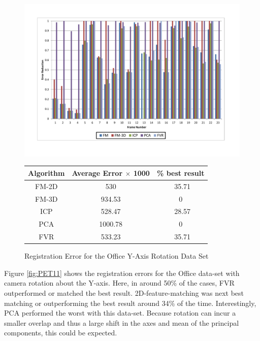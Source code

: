 \begin{figure}
\centering
\includegraphics[width=6in]{images/results/Office_Texture_Rotation}
\caption{Registration Error for the Office Y-Axis Rotation Data Set}
\label{fig:PET11}

\begin{tabular}{ccc}
\hline
\textbf{Algorithm} & \textbf{Average Error $\times$ 1000} & \textbf{\% best result}\\ \hline
FM-2D	& 530 & ~35.71\\
FM-3D	& 934.53 & 0\\
ICP		& 528.47 & ~28.57\\
PCA		& 1000.78 & 0\\
FVR		& 533.23 & ~35.71\\
\end{tabular}
\label{tab:PET11ST}
\end{figure} 


Figure \ref{fig:PET11} shows the registration errors for the Office data-set with camera rotation about the Y-axis. Here, in around 50\% of the cases, FVR outperformed or matched the best result. 2D-feature-matching was next best matching or outperforming the best result around 34\% of the time. Interestingly, PCA performed the worst with this data-set. Because rotation can incur a smaller overlap and thus a large shift in the axes and mean of the principal components, this could be expected. \\

